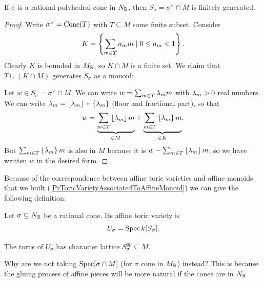 \begin{lemma}[Gordan]\label{LmGordan}
If $\sigma$ is a rational polyhedral cone in $N_{\mathbb{R}}$, then $S_\sigma=\sigma^\vee\cap M$ is finitely generated. 
\end{lemma}
\begin{proof}
Write $\sigma^\vee=\mathrm{Cone}(T)$ with $T\subseteq M$ some finite subset. Consider
\[K=\left\{{\sum_{m\in T}a_m m\mid 0\leq a_m<1}\right\}.\]
Clearly $K$ is bounded in $M_{\mathbb{R}}$, so $K\cap M$ is a finite set. We claim that $T\cup (K\cap M)$ generates $S_\sigma$ as a monoid:

Let $w\in S_\sigma=\sigma^\vee\cap M$. We can write $w=\sum_{m\in T}\lambda_m m$ with $\lambda_m>0$ real numbers. We can write $\lambda_m=\left\lfloor {\lambda_m}\right\rfloor+\left\{{\lambda_m}\right\}$ (floor and fractional part), so that
\[w=\underset{\in M}{\underbrace{\sum_{m\in T}\left\lfloor {\lambda_m}\right\rfloor m}}+\underset{\in K}{\underbrace{\sum_{m\in T}\left\{{\lambda_m}\right\}m}}.\]
But $\sum_{m\in T}\left\{{\lambda_m}\right\}m$ is also in $M$ because it is $w- \sum_{m\in T}\left\lfloor {\lambda_m}\right\rfloor m$, so we have written $w$ in the desired form.
\end{proof}

Because of the correspondence between affine toric varieties and affine monoids that we built (\ref{PrToricVarietyAssociatedToAffineMonoid}) we can give the following definition:

\begin{definition}[]
Let $\sigma\subseteq N_{\mathbb{R}}$ be a rational cone. Its affine toric variety is
\[U_\sigma=\operatorname{Spec} k[S_\sigma].\]
\end{definition}


\begin{remark}
The torus of $U_\sigma$ has character lattice $S_\sigma^{gp}\subseteq M$.
\end{remark}

\begin{remark}
Why are we not taking $\operatorname{Spec}[\sigma\cap M]$ (for $\sigma$ cone in $M_{\mathbb{R}}$) instead? This is because the gluing process of affine pieces will be more natural if the cones are in $N_{\mathbb{R}}$
\end{remark}

